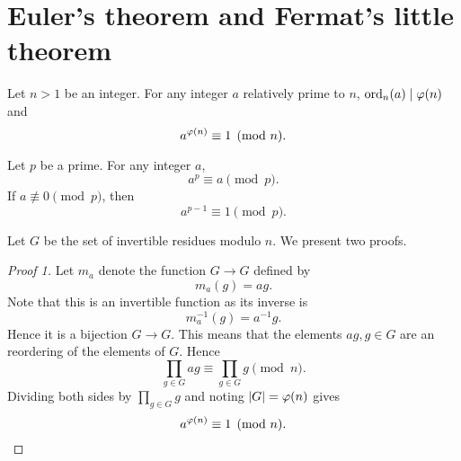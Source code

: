 \section{Euler's theorem and Fermat's little theorem}
\begin{thm}
Let $n>1$ be an integer.
For any integer $a$ relatively prime to $n$, $\operatorname{ord}_n(a)\mid \varphi(n)$ and
\[
a^{\varphi(n)}\equiv 1 \pmod{n}.
\]
\end{thm}
\begin{cor}
Let $p$ be a prime. For any integer $a$,
\[
a^p\equiv a\pmod{p}.
\]
If $a\nequiv 0\pmod{p}$, then
\[
a^{p-1}\equiv 1\pmod{p}.
\]
\end{cor}
Let $G$ be the set of invertible residues modulo $n$.
We present two proofs.
\begin{proof}[Proof 1]
Let $m_a$ denote the function $G\to G$ defined by
\[
m_a(g)=ag.
\]
Note that this is an invertible function as its inverse is
\[
m_a^{-1}(g)=a^{-1}g.
\]
Hence it is a bijection $G\to G$. This means that the elements $ag, g\in G$ are an reordering of the elements of $G$. Hence
\[
\prod_{g\in G} ag
\equiv
\prod_{g\in G}g\pmod{n}.
\]
Dividing both sides by $\prod_{g\in G}g$ and noting $|G|=\varphi(n)$ gives
\[
a^{\varphi(n)}\equiv 1\pmod{n}.\qedhere
\]
\end{proof}
